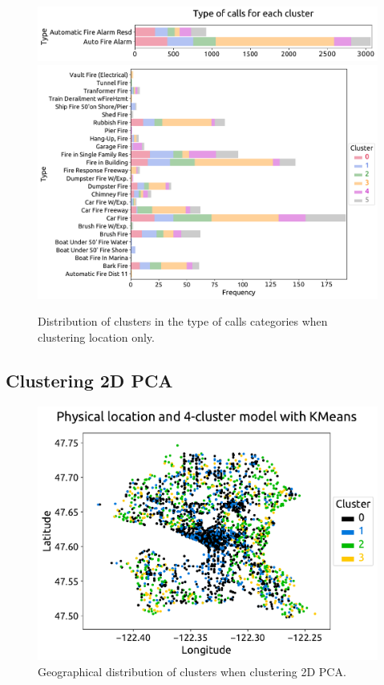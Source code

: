 \documentclass[12pt,a4paper]{article}
\begin{document}
\begin{figure}[ht!]
\centering
\includegraphics[scale=0.52]{figs/STORY_loc_type_1.pdf}
\includegraphics[scale=0.52]{figs/STORY_loc_type_2.pdf}
\caption{Distribution of clusters in the type of calls categories when clustering location only.}
\label{STORY_loc_type}
\end{figure}

\clearpage

\subsection{Clustering 2D PCA}

\begin{figure}[ht!]
\centering
\includegraphics[scale=0.6]{figs/STORY_2D_PCA_location.pdf}
\caption{Geographical distribution of clusters when clustering 2D PCA.}
\label{STORY_2D_PCA_location}
\end{figure}
\end{document}
